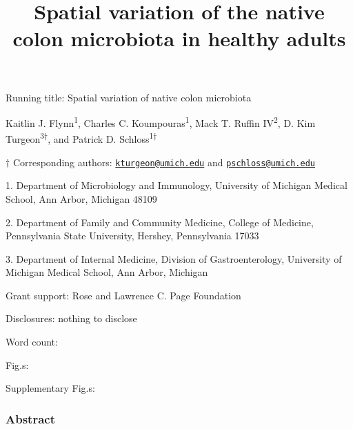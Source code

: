 \documentclass[12pt,]{article}
\title{Spatial variation of the native colon microbiota in healthy adults}
\author{}
\date{}
\begin{document}
\maketitle

\vspace{15mm}

Running title: Spatial variation of native colon microbiota

\vspace{15mm}

Kaitlin J. Flynn\textsuperscript{1}, Charles C.
Koumpouras\textsuperscript{1}, Mack T. Ruffin IV\textsuperscript{2}, D.
Kim Turgeon\textsuperscript{3\(\dagger\)}, and Patrick D.
Schloss\textsuperscript{1\(\dagger\)}

\vspace{15mm}

\(\dagger\) Corresponding authors:
\href{mailto:kturgeon@umich.edu}{\nolinkurl{kturgeon@umich.edu}} and
\href{mailto:pschloss@umich.edu}{\nolinkurl{pschloss@umich.edu}}

1. Department of Microbiology and Immunology, University of Michigan
Medical School, Ann Arbor, Michigan 48109

2. Department of Family and Community Medicine, College of Medicine,
Pennsylvania State University, Hershey, Pennsylvania 17033

3. Department of Internal Medicine, Division of Gastroenterology,
University of Michigan Medical School, Ann Arbor, Michigan

Grant support: Rose and Lawrence C. Page Foundation

Disclosures: nothing to disclose

Word count:

Fig.s:

Supplementary Fig.s:

\newpage

\subsubsection{Abstract}\label{abstract}
\end{document}
